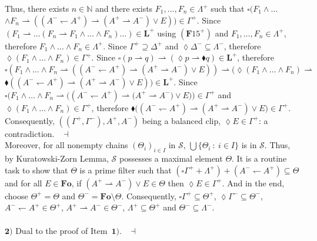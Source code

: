 \documentclass[draft]{article}
\newenvironment{proof}{{\bf Proof:}}{~$\dashv$\\}
\def\N{\mathbb{N}}
\def\Formula{\mathbf{A}}
\def\Formula{\mathbf{F}}
\def\Fo{\mathbf{Fo}}
\def\L{\mathbf{L}}
\begin{document}
\begin{proof}
\begin{proof}
Thus, there exists $n{\in}\N$ and there exists $F_{1},\ldots,F_{n}{\in}\Lambda^{+}$ such that ${\square}(F_{1}{\wedge}\ldots
%
%
%
%
%
%
%
$\linebreak$
%
%
%
%
%
%
{\wedge}F_{n}{\rightharpoonup}((A^{-}{\leftharpoondown}A^{+}){\rightharpoonup}(A^{+}{\rightharpoonup}A^{-}){\vee}E)){\in}\Gamma^{+}$.
Since $(F_{1}{\rightharpoonup}\ldots(F_{n}{\rightharpoonup}F_{1}{\wedge}\ldots{\wedge}F_{n})\ldots)
%
%
%
%
%
%
%
$\linebreak$
%
%
%
%
%
%
{\in}\L^{+}$ using $(\Formula15^{+})$ and $F_{1},\ldots,F_{n}{\in}\Lambda^{+}$, therefore $F_{1}{\wedge}\ldots{\wedge}F_{n}{\in}\Lambda^{+}$.
Since $\Gamma^{+}{\supseteq}\Delta^{+}$ and ${\lozenge}\Delta^{-}{\subseteq}\Lambda^{-}$, therefore ${\lozenge}(F_{1}{\wedge}\ldots{\wedge}F_{n}){\in}\Gamma^{+}$.
Since ${\square}(p{\rightharpoonup}q){\rightharpoonup}({\lozenge}p{\rightharpoonup}{\blacklozenge}q){\in}\L^{+}$, therefore ${\square}(F_{1}{\wedge}\ldots{\wedge}F_{n}{\rightharpoonup}((A^{-}{\leftharpoondown}A^{+}){\rightharpoonup}(A^{+}{\rightharpoonup}A^{-}){\vee}E)){\rightharpoonup}({\lozenge}(F_{1}{\wedge}\ldots{\wedge}F_{n}){\rightharpoonup}
%
%
%
%
%
%
%
$\linebreak$
%
%
%
%
%
%
{\blacklozenge}((A^{-}{\leftharpoondown}A^{+}){\rightharpoonup}(A^{+}{\rightharpoonup}A^{-}){\vee}E)){\in}\L^{+}$.
Since ${\square}(F_{1}{\wedge}\ldots{\wedge}F_{n}{\rightharpoonup}((A^{-}{\leftharpoondown}A^{+}){\rightharpoonup}(A^{+}
%
%
%
%
%
%
%
$\linebreak$
%
%
%
%
%
%
{\rightharpoonup}A^{-}){\vee}E)){\in}\Gamma^{+}$ and ${\lozenge}(F_{1}{\wedge}\ldots{\wedge}F_{n}){\in}\Gamma^{+}$, therefore ${\blacklozenge}((A^{-}{\leftharpoondown}A^{+}){\rightharpoonup}(A^{+}{\rightharpoonup}A^{-}){\vee}
%
%
%
%
%
%
%
$\linebreak$
%
%
%
%
%
%
E){\in}\Gamma^{+}$.
Consequently, $((\Gamma^{+},\Gamma^{-}),A^{+},A^{-})$ being a balanced clip, ${\lozenge}E{\in}\Gamma^{+}$: a contradiction.
%
%
\medskip
%
%
\end{proof}
%
%
Moreover, for all nonempty chains $(\Theta_{i})_{i{\in}I}$ in ${\mathcal S}$, $\bigcup\{\Theta_{i}\ :\ i{\in}I\}$ is in ${\mathcal S}$.
Thus, by Kuratowski-Zorn Lemma, ${\mathcal S}$ possesses a maximal element $\Theta$.
It is a routine task to show that $\Theta$ is a prime filter such that $({\square}\Gamma^{+}{+}\Lambda^{+}){+}(A^{-}{\leftharpoondown}A^{+}){\subseteq}\Theta$ and for all $E{\in}\Fo$, if $(A^{+}{\rightharpoonup}A^{-}){\vee}E{\in}\Theta$ then ${\lozenge}E{\in}\Gamma^{+}$.
And in the end, choose $\Theta^{+}{=}\Theta$ and $\Theta^{-}{=}\Fo{\setminus}\Theta$.
Consequently, ${\square}\Gamma^{+}{\subseteq}\Theta^{+}$, ${\lozenge}\Gamma^{-}{\subseteq}\Theta^{-}$, $A^{-}{\leftharpoondown}A^{+}{\in}\Theta^{+}$, $A^{+}{\rightharpoonup}A^{-}{\in}\Theta^{-}$, $\Lambda^{+}{\subseteq}\Theta^{+}$ and $\Theta^{-}{\subseteq}\Lambda^{-}$.
%
%
\\
\\
%
%
$\mathbf{2)}$ Dual to the proof of Item~$\mathbf{1)}$.
%
%
\medskip
%
%
\end{proof}
\end{document}
